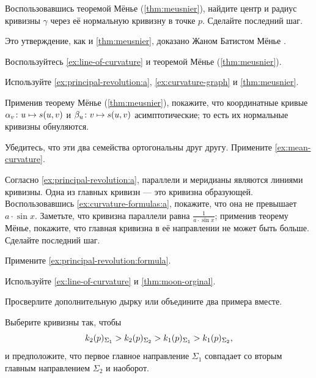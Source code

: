 \begin{multicols}{2}
Воспользовавшись теоремой Мёнье (\ref{thm:meusnier}), найдите центр и радиус кривизны $\gamma$ через её нормальную кривизну в точке $p$.
Сделайте последний шаг.

Это утверждение, как и \ref{thm:meusnier}, доказано Жаном Батистом Мёнье \cite{meusnier}.

Воспользуйтесь \ref{ex:line-of-curvature} и теоремой Мёнье (\ref{thm:meusnier}).

Используйте \ref{ex:principal-revolution:a},  \ref{ex:curvature-graph} и \ref{thm:meusnier}.

Применив теорему Мёнье (\ref{thm:meusnier}), покажите, что координатные кривые $\alpha_v\:u\z\mapsto s(u,v)$ и $\beta_u\:v\z\mapsto s(u,v)$ асимптотические; то есть их нормальные кривизны обнуляются.

Убедитесь, что эти два семейства ортогональны друг другу.
Примените \ref{ex:mean-curvature}.

Согласно \ref{ex:principal-revolution:a}, параллели и меридианы являются линиями кривизны.
Одна из главных кривизн --- это кривизна образующей.
Воспользовавшись \ref{ex:curvature-formulas:a}, покажите, что она не превышает $a\cdot \sin x$.
Заметьте, что кривизна параллели равна $\tfrac1{a\cdot \sin x}$;
применив теорему Мёнье, покажите, что главная кривизна в её направлении не может быть больше.
Сделайте последний шаг.

Примените \ref{ex:principal-revolution:formula}.

Используйте \ref{ex:line-of-curvature} и \ref{thm:moon-orginal}.

Просверлите дополнительную дырку или объедините два примера вместе.



\setcounter{eqtn}{0}

Выберите кривизны так, чтобы 
\[k_2(p)_{\Sigma_1}\z>k_2(p)_{\Sigma_2}> k_1(p)_{\Sigma_1}> k_1(p)_{\Sigma_2},\]
и предположите, что первое главное направление $\Sigma_1$ совпадает со вторым главным направлением $\Sigma_2$ и наоборот.


\end{multicols}
